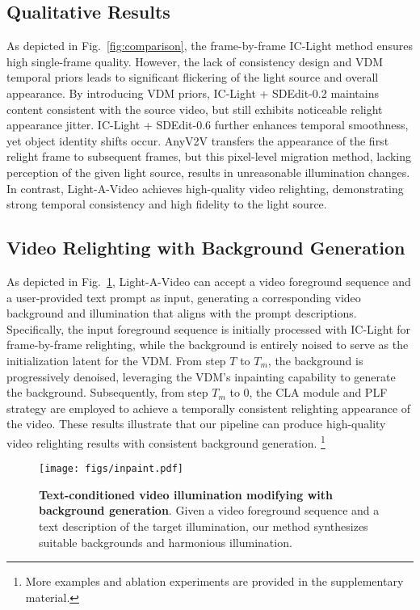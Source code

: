 \subsection{Qualitative Results}
\label{sec:QR}
As depicted in Fig.~\ref{fig:comparison},
the frame-by-frame IC-Light method ensures high single-frame quality.
However, the lack of consistency design and VDM temporal priors leads to
significant flickering of the light source and overall appearance. 
By introducing VDM priors, IC-Light + SDEdit-0.2 maintains content consistent with the source video, 
but still exhibits noticeable relight appearance jitter. 
IC-Light + SDEdit-0.6 further enhances temporal smoothness, 
yet object identity shifts occur.  
AnyV2V transfers the appearance of the first relight
frame to subsequent frames, 
but this pixel-level migration method, 
lacking perception of the given light source,
results in unreasonable illumination changes.
In contrast, Light-A-Video achieves high-quality video relighting, 
demonstrating strong temporal consistency and high fidelity to the light source.

\subsection{Video Relighting with Background Generation}
\label{sec:APP}
\vspace{-0.5em}
As depicted in Fig.~\ref{fig:inpaint}, Light-A-Video can accept a video foreground sequence and
a user-provided text prompt as input, generating a corresponding video background 
and illumination that aligns with the prompt descriptions.
Specifically, the input foreground sequence is initially processed
with IC-Light for frame-by-frame relighting,
while the background is entirely noised to serve as the initialization latent for the VDM.
From step $T$ to $T_m$, the background is progressively denoised,
leveraging the VDM's inpainting capability to generate the background.
Subsequently, from step $T_m$ to 0, the CLA module and PLF strategy are employed to achieve a temporally consistent  
relighting appearance of the video. 
These results illustrate that our pipeline
can produce high-quality video relighting results with consistent background generation. \footnote{More examples and ablation experiments are provided in the supplementary material.}


\begin{figure}[htp]
\centering
\texttt{[image: figs/inpaint.pdf]}
\vspace{-2.5em}
\caption{{\bf Text-conditioned video illumination modifying with background generation}. 
Given a video foreground sequence and a text description of the target illumination, our method synthesizes suitable backgrounds and harmonious illumination.
}
\label{fig:inpaint}
\vspace{-1.5em}
\end{figure}

